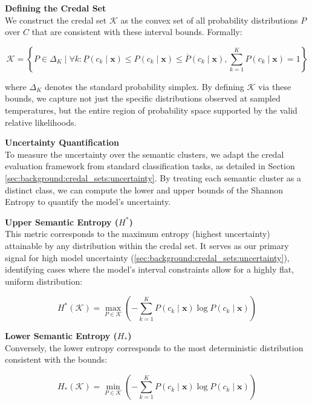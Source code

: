 \textbf{Defining the Credal Set} \\
We construct the credal set $\mathcal{K}$ as the convex set of all 
probability distributions $P$ over $C$ that are consistent with these
interval bounds. Formally:

\begin{equation}
    \mathcal{K} = \left\{ P \in \Delta_K \mid \forall k: 
	\underline{P}(c_k \mid \mathbf{x}) \leq P(c_k \mid \mathbf{x}) \leq \overline{P}(c_k \mid \mathbf{x}),
    \sum_{k = 1}^K P(c_k \mid \mathbf{x}) = 1 \right\}
    \label{eq:credal_set}
\end{equation}

where $\Delta_K$ denotes the standard probability simplex. By defining
$\mathcal{K}$ via these bounds, we capture not just the specific 
distributions observed at sampled temperatures, but the entire region 
of probability space supported by the valid relative likelihoods.

\textbf{Uncertainty Quantification} \\
To measure the uncertainty over the semantic clusters, we adapt
the credal evaluation framework from standard classification tasks,
as detailed in Section \ref{sec:background:credal_sets:uncertainty}.
By treating each semantic cluster as a distinct class, we can compute
the lower and upper bounds of the Shannon Entropy to quantify the
model's uncertainty.

\textbf{Upper Semantic Entropy ($H^*$)} \\
This metric corresponds to the maximum entropy (highest uncertainty)
attainable by any distribution within the credal set. It serves as 
our primary signal for high model uncertainty
(\ref{sec:background:credal_sets:uncertainty}), 
identifying cases 
where the model's interval constraints allow for a highly flat, 
uniform distribution:

\begin{equation}
    H^*(\mathcal{K}) = \max_{P \in \mathcal{K}} 
    \left( - \sum_{k=1}^K P(c_k \mid \mathbf{x}) \log P(c_k \mid \mathbf{x}) \right)
    \label{eq:upper_semantic_entropy}
\end{equation}

\textbf{Lower Semantic Entropy ($H_*$)} \\
Conversely, the lower entropy corresponds to the most deterministic
distribution consistent with the bounds: 

\begin{equation}
    H_*(\mathcal{K}) = \min_{P \in \mathcal{K}}
    \left( - \sum_{k=1}^K P(c_k \mid \mathbf{x}) \log P(c_k \mid \mathbf{x})\right)
    \label{eq:lower_semantic_entropy}
\end{equation}

